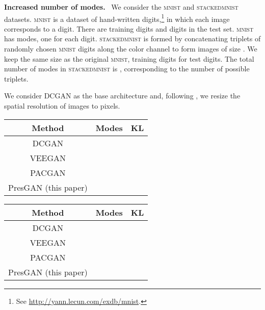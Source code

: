 \documentclass[11pt]{article}
\DeclareRobustCommand{\parhead}[1]{\textbf{#1}~}
\begin{document}
\parhead{Increased number of modes.} We consider the \textsc{mnist} and \textsc{stackedmnist} datasets. \textsc{mnist} is a dataset of hand-written digits,\footnote{See \url{http://yann.lecun.com/exdb/mnist}.} in which each  image corresponds to a digit. There are  training digits and  digits in the test set. \textsc{mnist} has  modes, one for each digit. \textsc{stackedmnist} is formed by concatenating triplets of randomly chosen \textsc{mnist} digits along the color channel to form images of size  \citep{Metz2017}. We keep the same size as the original \textsc{mnist},  training digits for  test digits. The total number of modes in \textsc{stackedmnist} is , corresponding to the number of possible triplets.

We consider \gls{DCGAN} as the base architecture and, following \citet{radford2015unsupervised}, we resize the spatial resolution of images to  pixels.

\begin{table*}[t]
	\centering
	\small
	\begin{tabular}{ccc}
	\toprule
	 Method & Modes & KL \\
	 \hline
	 \acrshort{DCGAN} \citep{radford2015unsupervised} &   &  \\
	 \acrshort{VEEGAN} \citep{srivastava2017veegan} &  &   \\
	  \acrshort{PACGAN} \citep{lin2018pacgan} &  &  \\
	  Pres\acrshort{GAN} (this paper) &  &  \\
	\bottomrule
	\end{tabular}
	\label{tab:collapse_dimensionality_mnist}
\end{table*}

\begin{table*}[t]
	\centering
	\small
	\begin{tabular}{ccc}
	\toprule
	 Method & Modes & KL \\
	 \hline
	 \acrshort{DCGAN} \citep{radford2015unsupervised} &   &  \\
	 \acrshort{VEEGAN} \citep{srivastava2017veegan} &  &  \\
	  \acrshort{PACGAN} \citep{lin2018pacgan} &   &  \\
	  Pres\acrshort{GAN} (this paper) &  &  \\
	\bottomrule
	\end{tabular}
	\label{tab:collapse_dimensionality_smnist}
\end{table*}
\end{document}
